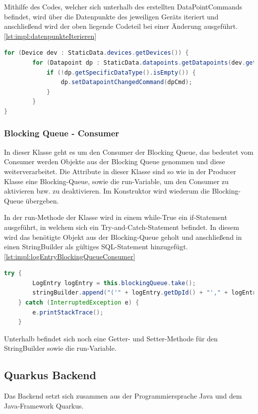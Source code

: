  
Mithilfe des Codes, welcher sich unterhalb des erstellten DataPointCommands befindet, wird über die Datenpunkte des jeweiligen Geräts iteriert und anschließend wird der oben liegende Codeteil bei einer Änderung ausgeführt. \ref{lst:impl:datenpunkteIterieren}
 
\begin{lstlisting}[language=java,caption=Datenpunkte des jeweiligen Geräts iterieren,label=lst:impl:datenpunkteIterieren]
    for (Device dev : StaticData.devices.getDevices()) {
        for (Datapoint dp : StaticData.datapoints.getDatapoints(dev.getId())) {
            if (!dp.getSpecificDataType().isEmpty()) {
                dp.setDatapointChangedCommand(dpCmd);
            }
        }
}
\end{lstlisting}

\subsubsection{Blocking Queue - Consumer }
In dieser Klasse geht es um den Consumer der Blocking Queue, das bedeutet vom Consumer werden Objekte aus der Blocking Queue genommen und diese weiterverarbeitet. Die Attribute in dieser Klasse sind so wie in der Producer Klasse eine Blocking-Queue, sowie die run-Variable, um den Consumer zu aktivieren bzw. zu deaktivieren. Im Konstruktor wird wiederum die Blocking-Queue übergeben.
 
In der run-Methode der Klasse wird in einem while-True ein if-Statement ausgeführt, in welchem sich ein Try-and-Catch-Statement befindet. In diesem wird das benötigte Objekt aus der Blocking-Queue geholt und anschließend in einen StringBuilder als gültiges SQL-Statement hinzugefügt. \ref{lst:impl:logEntryBlockingQueueConsumer}

 \begin{lstlisting}[language=java,caption=Daten aus BlockingQueue herausnehmen,label=lst:impl:logEntryBlockingQueueConsumer]
    try {
        LogEntry logEntry = this.blockingQueue.take();
        stringBuilder.append("('" + logEntry.getDpId() + "'," + logEntry.getValue() + "," + "'A'," + logEntry.getTimeStamp() + "),");
    } catch (InterruptedException e) {
        e.printStackTrace();
    }
\end{lstlisting}

Unterhalb befindet sich noch eine Getter- und Setter-Methode für den StringBuilder sowie die run-Variable.
 
\subsection{Quarkus Backend}
Das Backend setzt sich zusammen aus der Programmiersprache Java und dem Java-Framework Quarkus.
 
